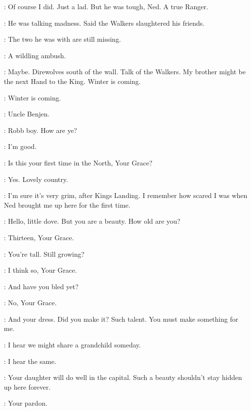 \BENJEN: Of course I did. Just a lad. But he was tough, Ned. A true Ranger. 

\NED: He was talking madness. Said the Walkers slaughtered his friends. 

\BENJEN: The two he was with are still missing. 

\NED: A wildling ambush. 

\BENJEN: Maybe. Direwolves south of the wall. Talk of the Walkers. My brother might be the next Hand to the King. Winter is coming. 

\NED: Winter is coming. 


\ROBB: Uncle Benjen. 

\BENJEN: Robb boy. How are ye? 

\ROBB: I'm good. 


\CATELYN: Is this your first time in the North, Your Grace? 

\CERSEI: Yes. Lovely country. 

\CATELYN: I'm sure it's very grim, after Kings Landing. I remember how scared I was when Ned brought me up here for the first time. 


\CERSEI: Hello, little dove. But you are a beauty. How old are you? 

\SANSA: Thirteen, Your Grace. 

\CERSEI: You're tall. Still growing? 

\SANSA: I think so, Your Grace. 

\CERSEI: And have you bled yet? 

\SANSA: No, Your Grace. 

\CERSEI: And your dress. Did you make it? Such talent. You must make something for me. 


\CERSEI: I hear we might share a grandchild someday. 

\CATELYN: I hear the same. 

\CERSEI: Your daughter will do well in the capital. Such a beauty shouldn't stay hidden up here forever. 


\NED: Your pardon. 

